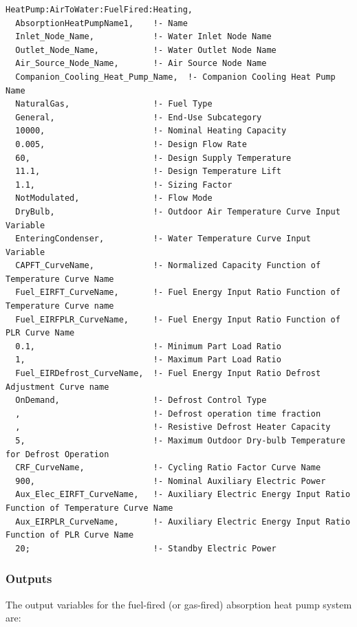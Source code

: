 \begin{lstlisting}
HeatPump:AirToWater:FuelFired:Heating,
  AbsorptionHeatPumpName1,    !- Name
  Inlet_Node_Name,            !- Water Inlet Node Name
  Outlet_Node_Name,           !- Water Outlet Node Name
  Air_Source_Node_Name,       !- Air Source Node Name
  Companion_Cooling_Heat_Pump_Name,  !- Companion Cooling Heat Pump Name
  NaturalGas,                 !- Fuel Type
  General,                    !- End-Use Subcategory
  10000,                      !- Nominal Heating Capacity
  0.005,                      !- Design Flow Rate
  60,                         !- Design Supply Temperature
  11.1,                       !- Design Temperature Lift
  1.1,                        !- Sizing Factor
  NotModulated,               !- Flow Mode
  DryBulb,                    !- Outdoor Air Temperature Curve Input Variable
  EnteringCondenser,          !- Water Temperature Curve Input Variable
  CAPFT_CurveName,            !- Normalized Capacity Function of Temperature Curve Name
  Fuel_EIRFT_CurveName,       !- Fuel Energy Input Ratio Function of Temperature Curve name
  Fuel_EIRFPLR_CurveName,     !- Fuel Energy Input Ratio Function of PLR Curve Name
  0.1,                        !- Minimum Part Load Ratio
  1,                          !- Maximum Part Load Ratio
  Fuel_EIRDefrost_CurveName,  !- Fuel Energy Input Ratio Defrost Adjustment Curve name
  OnDemand,                   !- Defrost Control Type
  ,                           !- Defrost operation time fraction
  ,                           !- Resistive Defrost Heater Capacity
  5,                          !- Maximum Outdoor Dry-bulb Temperature for Defrost Operation
  CRF_CurveName,              !- Cycling Ratio Factor Curve Name
  900,                        !- Nominal Auxiliary Electric Power
  Aux_Elec_EIRFT_CurveName,   !- Auxiliary Electric Energy Input Ratio Function of Temperature Curve Name
  Aux_EIRPLR_CurveName,       !- Auxiliary Electric Energy Input Ratio Function of PLR Curve Name
  20;                         !- Standby Electric Power
\end{lstlisting}

\subsubsection{Outputs}

The output variables for the fuel-fired (or gas-fired) absorption heat pump system are:

